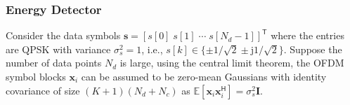 \documentclass[11pt]{article}
\newcommand{\bx}{\mathbf{x}}
\newcommand{\bs}{\mathbf{s}}
\newcommand{\Ex}{\mathbb{E}}
\newcommand{\TT}{\mathsf{T}}
\newcommand{\HH}{\mathsf{H}}
\newcommand{\jj}{\mathrm{j}}
\begin{document}

\subsubsection*{Energy Detector}
\label{subsubsec:energyDetector}

Consider the data symbols $\bs = \left[ s[0] \; s[1] \; \cdots \; s[N_{d}-1] \right]^{\TT}$ where the entries are QPSK with variance $\sigma_{s}^{2} = 1$, i.e., $s[k] \in \{ \pm 1/\sqrt{2} \pm \jj 1/\sqrt{2} \}$. Suppose the number of data points $N_{d}$ is large, using the central limit theorem, the OFDM symbol blocks $\bx_{i}$ can be assumed to be zero-mean Gaussians with identity covariance of size $(K+1)(N_{d}+N_{c})$ as $\Ex[\bx_{i} \bx_{i}^{\HH}] = \sigma_{s}^{2} \mathbf{I}$.
\end{document}
